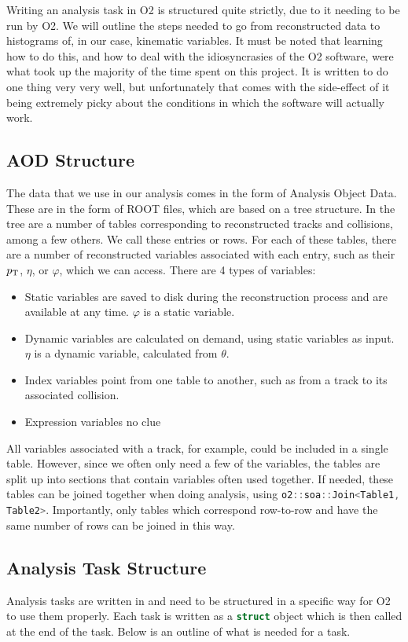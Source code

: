 Writing an analysis task in O2 is structured quite strictly, due to it needing to be run by O2. We will outline the steps needed to go from reconstructed data to histograms of, in our case, kinematic variables. It must be noted that learning how to do this, and how to deal with the idiosyncrasies of the O2 software, were what took up the majority of the time spent on this project. It is written to do one thing very very well, but unfortunately that comes with the side-effect of it being extremely picky about the conditions in which the software will actually work. 

\subsection{AOD Structure}\label{sec:AODStructure}
The data that we use in our analysis comes in the form of Analysis Object Data. These are in the form of ROOT files, which are based on a tree structure. In the tree are a number of tables corresponding to reconstructed tracks and collisions, among a few others. We call these entries or rows. For each of these tables, there are a number of reconstructed variables associated with each entry, such as their $p_\mathrm{T}$, $\eta$, or $\varphi$, which we can access. There are 4 types of variables:
\begin{itemize}
    \item Static variables are saved to disk during the reconstruction process and are available at any time. $\varphi$ is a static variable.
    \item Dynamic variables are calculated on demand, using static variables as input. $\eta$ is a dynamic variable, calculated from $\theta$. 
    \item Index variables point from one table to another, such as from a track to its associated collision.
    \item Expression variables no clue
\end{itemize}

All variables associated with a track, for example, could be included in a single table. However, since we often only need a few of the variables, the tables are split up into sections that contain variables often used together. If needed, these tables can be joined together when doing analysis, using \lstinline[language=C++]{o2::soa::Join<Table1, Table2>}. Importantly, only tables which correspond row-to-row and have the same number of rows can be joined in this way.

\subsection{Analysis Task Structure}\label{sec:TaskStructure}
Analysis tasks are written in \Cpp and need to be structured in a specific way for O2 to use them properly. Each task is written as a \lstinline[language=C++]{struct} object which is then called at the end of the task. Below is an outline of what is needed for a task.

